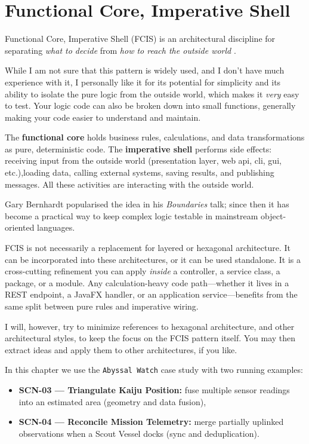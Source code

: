 \chapter{Functional Core, Imperative Shell}
\label{ch:fcis}

Functional Core, Imperative Shell (FCIS) is an architectural discipline for separating \textit{what to decide} from \textit{how to reach the outside world}
\autocite{bernhardt2012boundaries,seemannFcis}.

While I am not sure that this pattern is widely used, and I don't have much experience with it, I personally like it for its potential for simplicity and its ability to isolate the pure logic from the outside world, which makes it \textit{very} easy to test. Your logic code can also be broken down into small functions, generally making your code easier to understand and maintain.

The \textbf{functional core} holds business rules, calculations, and data transformations as pure, deterministic code. The \textbf{imperative shell} performs side effects: receiving input from the outside world (presentation layer, web api, cli, gui, etc.),loading data, calling external systems, saving results, and publishing messages. All these activities are interacting with the outside world.

\medskip

Gary Bernhardt popularised the idea in his \textit{Boundaries} talk; since then it has become a practical way to keep complex logic testable in mainstream object-oriented languages.\autocite{googleFcis2025,ssenseFcis,fritzscheFcis}

FCIS is not necessarily a replacement for layered or hexagonal architecture. It can be incorporated into these architectures, or it can be used standalone. It is a cross-cutting refinement you can apply \textit{inside} a controller, a service class, a package, or a module. Any calculation-heavy code path---whether it lives in a REST endpoint, a JavaFX handler, or an application service---benefits from the same split between pure rules and imperative wiring.


I will, however, try to minimize references to hexagonal architecture, and other architectural styles, to keep the focus on the FCIS pattern itself. You may then extract ideas and apply them to other architectures, if you like.

\medskip


In this chapter we use the \texttt{Abyssal Watch} case study with two running examples:
\begin{itemize}
    \item \textbf{SCN-03 --- Triangulate Kaiju Position:} fuse multiple sensor readings into an estimated area (geometry and data fusion),
    \item \textbf{SCN-04 --- Reconcile Mission Telemetry:} merge partially uplinked observations when a Scout Vessel docks (sync and deduplication).
\end{itemize}

